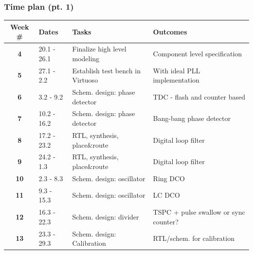 \documentclass[t, screen, aspectratio=43]{beamer}
\begin{document}
\begin{frame}
	\frametitle{Time plan (pt. 1)}
	\begin{table}[htb!]
		\tiny
		\centering
		\vspace{-1em}
		\def\arraystretch{1.5}		
		\setlength\arrayrulewidth{0.75pt}
		\setlength{\tabcolsep}{1em} %
		\begin{tabular}{|c|l|l|l|}
			\hline 
			\rule[-1ex]{0pt}{2.5ex}\cellcolor{gray!40}\textbf{Week \#} & \cellcolor{gray!40}\textbf{Dates} &\cellcolor{gray!40}\textbf{Tasks} & \cellcolor{gray!40}\textbf{Outcomes}\\ 
			\hline 
			\rule[-1ex]{0pt}{2.5ex}\cellcolor{red!40}\textbf{4}&\cellcolor{red!40}20.1 - 26.1 &\cellcolor{red!40}Finalize high level modeling &\cellcolor{red!40}Component level specification\\ 
			\hline 
			\rule[-1ex]{0pt}{2.5ex}\textbf{5}\cellcolor{green!40}&\cellcolor{green!40}27.1 - 2.2 &\cellcolor{green!40}Establish test bench in Virtuoso &\cellcolor{green!40}With ideal PLL implementation\\ 
			\hline 
			\rule[-1ex]{0pt}{2.5ex}\textbf{6}& 3.2 - 9.2& Schem. design: phase detector & TDC - flash and counter based \\ 
			\hline 
			\rule[-1ex]{0pt}{2.5ex}\textbf{7}& 10.2 - 16.2& Schem. design: phase detector & Bang-bang phase detector\\ 
			\hline 
			\rule[-1ex]{0pt}{2.5ex}\textbf{8}&17.2 - 23.2& RTL, synthesis, place\&route & Digital loop filter\\ 
			\hline 
			\rule[-1ex]{0pt}{2.5ex}\textbf{9}&24.2 - 1.3& RTL, synthesis, place\&route & Digital loop filter\\ 
			\hline 
			\rule[-1ex]{0pt}{2.5ex}\textbf{10}&2.3 - 8.3& Schem. design: oscillator & Ring DCO\\ 
			\hline 
			\rule[-1ex]{0pt}{2.5ex}\textbf{11}&9.3 - 15.3& Schem. design: oscillator & LC DCO\\ 
			\hline 
			\rule[-1ex]{0pt}{2.5ex}\textbf{12}&16.3 - 22.3& Schem. design: divider  &TSPC + pulse swallow or sync counter?\\ 
			\hline 
			\rule[-1ex]{0pt}{2.5ex}\textbf{13}&23.3 - 29.3&Schem. design: Calibration& RTL/schem. for calibration\\ 
			\hline 

\end{tabular}
\end{table}
\end{frame}
\end{document}
